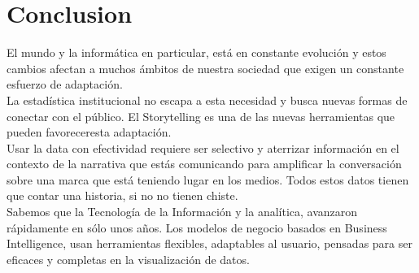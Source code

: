 \documentclass[preprint,12pt]{elsarticle}
\begin{document}
\section{Conclusion}

		El mundo y la informática en particular, está en constante evolución y estos cambios afectan a muchos ámbitos de nuestra sociedad que exigen un constante esfuerzo de adaptación.\\

La estadística institucional no escapa a esta necesidad y busca nuevas formas de conectar con el público. El Storytelling es una de las nuevas herramientas que pueden favoreceresta adaptación.\\

Usar la data con efectividad requiere ser selectivo y aterrizar información en el contexto de la narrativa que estás comunicando para amplificar la conversación sobre una marca que está teniendo lugar en los medios. Todos estos datos tienen que contar una historia, si no no tienen chiste. \\

Sabemos que la Tecnología de la Información y la analítica, avanzaron rápidamente en sólo unos años. Los modelos de negocio basados en Business Intelligence, usan herramientas flexibles, adaptables al usuario, pensadas para ser eficaces y completas en la visualización de datos.\\

	

	
	
	\newpage
	
	
	
	
	
	
	
	
	
	
	
	
	
	
\end{document}

